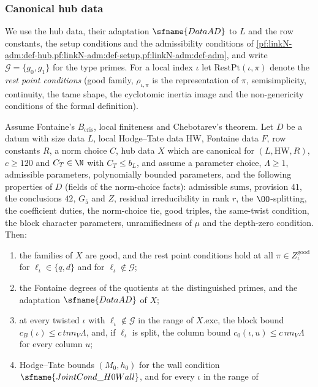 \subsubsection{Canonical hub data}

We use the hub data, their adaptation $\sfname{DataAD}$ to $L$ and the row constants, the setup conditions and the admissibility
conditions of \cref{pf:linkN-adm:def-hub,pf:linkN-adm:def-setup,pf:linkN-adm:def-adm}, and write $\mathcal G=\{g_0,g_1\}$ for the
type primes. For a local index $\iota$ let $\mathrm{RestPt}(\iota,\pi)$ denote the \emph{rest point conditions} (good family,
$\rho_{\iota,\pi}$ is the representation of $\pi$, semisimplicity, continuity, the tame shape, the cyclotomic inertia image and the
non-genericity conditions of the formal definition).

\begin{theorem}\label{pf:sh-theta:hub}
Assume Fontaine's $B_{\mathrm{cris}}$, local finiteness and Chebotarev's theorem. Let $D$ be a datum with size data $L$, local
Hodge--Tate data $\mathrm{HW}$, Fontaine data $F$, row constants $R$, a norm choice $C$, hub data $X$ which are canonical for
$(L,\mathrm{HW},R)$, $c\ge120$ and $C_T\in\N$ with $C_T\le b_L$, and assume a parameter choice, $\Lambda\ge1$, admissible parameters,
polynomially bounded parameters, and the following properties of $D$ (fields of the norm-choice facts): admissible sums,
provision $41$, the conclusions $42$, $G_5$ and $Z$, residual irreducibility in rank $r$, the $\OO$-splitting, the coefficient
duties, the norm-choice tie, good triples, the same-twist condition, the block character parameters, unramifiedness of $\mu$ and
the depth-zero condition. Then:
\begin{enumerate}[label=(H\arabic*),leftmargin=*]
\item the families of $X$ are good, and the rest point conditions hold at all $\pi\in Z^{\mathrm{good}}_\iota$ for $\ell_\iota\in\{q,d\}$
and for $\ell_\iota\notin\mathcal G$;
\item the Fontaine degrees of the quotients at the distinguished primes, and the adaptation $\sfname{DataAD}$ of $X$;
\item at every twisted $\iota$ with $\ell_\iota\notin\mathcal G$ in the range of $X.\mathrm{exc}$, the block bound
$c_B(\iota)\le c\,tnn_V\Lambda$, and, if $\ell_\iota$ is split, the column bound $c_0(\iota,u)\le c\,nn_V\Lambda$ for every column $u$;
\item Hodge--Tate bounds $(M_0,h_0)$ for the wall condition $\sfname{JointCond\_H0Wall}$, and for every $\iota$ in the range of

\end{enumerate}
\end{theorem}
